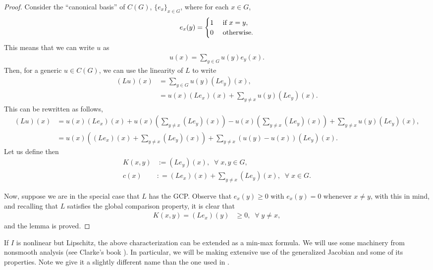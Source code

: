 \documentclass[11pt,reqno]{amsart}
\numberwithin{equation}{section}
\theoremstyle{plain}
\begin{document}
\begin{proof}
  Consider the ``canonical basis'' of $C(G)$, $\{e_x\}_{x\in G}$, where for each $x\in G$,
  \begin{align*}
    e_x(y) = \begin{cases}
	1 & \textnormal{ if } x=y,\\
	0 & \textnormal{ otherwise}.
    \end{cases}	  
  \end{align*}	
  This means that we can write $u$ as
  \begin{align*}
	  u(x) = \sum_{y\in G} u(y)e_y(x). 
  \end{align*}
	Then, for a generic $u \in C(G)$, we can use the linearity of $L$ to write
  \begin{align*}
    (Lu)(x) & = \sum \limits_{y\in G}u(y)(Le_y)(x),\\
	        & = u(x)(Le_x)(x)+\sum \limits_{y\neq x}u(y)(Le_y)(x).
  \end{align*}
  This can be rewritten as follows,
  \begin{align*}
    (Lu)(x) & = u(x)(Le_x)(x)+u(x)\left (\sum \limits_{y\neq x} (Le_y)(x) \right )-u(x)\left (\sum \limits_{y\neq x} (Le_y)(x) \right )	+ \sum \limits_{y\neq x}u(y)(Le_y)(x),\\
	        & = u(x)\left ( (Le_x)(x) + \sum \limits_{y\neq x} (Le_y)(x)  \right )+\sum \limits_{y\neq x} (u(y)-u(x))(Le_y)(x).
  \end{align*}	  
  Let us define then
  \begin{align*}
	K(x,y) & := (Le_y)(x),\;\;\forall\;x,y\in G,\\  
    c(x) & : =  (Le_x)(x) + \sum \limits_{y\neq x} (Le_y)(x),\;\;\forall\;x \in G.
  \end{align*}
  
  
  Now, suppose we are in the special case that $L$ has the GCP.
  Observe that $e_x(y)\geq 0$ with $e_x(y)=0$ whenever $x\neq y$, with this in mind, and recalling that $L$ satisfies the global comparison property, it is clear that
  \begin{align*}	  
    K(x,y) = (Le_x)(y) & \geq 0,\;\;\forall\;y \not= x,
  \end{align*}
  and the lemma is proved.
\end{proof}

If $I$ is nonlinear but Lipschitz, the above characterization can be extended as a min-max formula.  We will use some machinery from nonsmooth analysis (see Clarke's book \cite{Cla1990optimization}). In particular, we will be making extensive use of the generalized Jacobian and some of its properties.  Note we give it a slightly different name than the one used in \cite{Cla1990optimization}.
\end{document}
